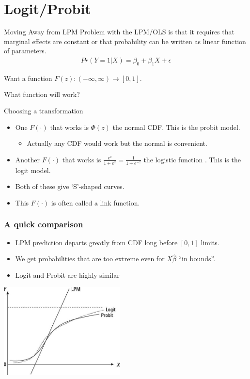 \documentclass[11pt,dvipsnames,table,aspectratio=169]{beamer}
\begin{document}
\section{Logit/Probit}


\begin{frame}{Moving Away from LPM}
Problem with the LPM/OLS is that it requires that \alert{marginal effects are constant} or that probability can be written as linear function of parameters.
\begin{eqnarray*}
Pr(Y=1 | X) = \beta_0 + \beta_1 X+ \epsilon
\end{eqnarray*}

Want a function $F(z): (-\infty,\infty) \rightarrow [0,1]$.

What function will work?

\end{frame}

\begin{frame}{Choosing a transformation}
       \begin{itemize}
       \item One $F(\cdot)$ that works is $\Phi(z)$ the normal CDF. This is the \alert{probit} model.
       \begin{itemize}
       \item Actually any CDF would work but the normal is convenient.
       \end{itemize}
       \item Another $F(\cdot)$ that works is $\frac{e^z}{1+ e^z}=\frac{1}{1+e^{-z}}$ the logistic function . This is the \alert{logit} model.
       \item Both of these give `S'-shaped curves.
       \item This $F(\cdot)$ is often called a \alert{link function}. 
       \end{itemize}
\end{frame}


\begin{frame}
       \frametitle{A quick comparison}
       \begin{itemize}
       \item LPM prediction departs greatly from CDF long before $[0,1]$ limits.
       \item We get probabilities that are too extreme even for $X\hat{\beta}$ ``in bounds''.
       \item Logit and Probit are highly similar
       \end{itemize}
       \begin{center}
       \includegraphics[width=2.5in]{resources/lpm-probit.jpg}
       \end{center}
\end{frame}
\end{document}
